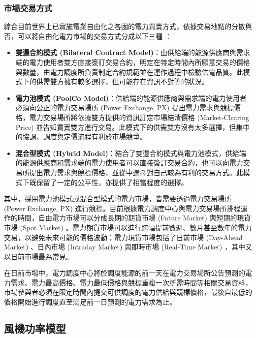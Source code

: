 \subsubsection{市場交易方式}

綜合目前世界上已實施電業自由化之各國的電力買賣方式，依據交易地點的分散與否，可以將自由化電力市場的交易方式分成以下三種 \cite{li2005strategic}：
%
\begin{itemize}
  \item \textbf{雙邊合約模式 (Bilateral Contract Model)}：由供給端的能源供應商與需求端的電力使用者雙方直接簽訂交易合約，明定在特定時間內所願意交易的價格與數量，由電力調度所負責制定合約規範並在運作過程中檢驗供電品質。此模式下的供需雙方擁有較多選擇，但可能存在資訊不對等的狀況。
  \item \textbf{電力池模式 (PoolCo Model)}：供給端的能源供應商與需求端的電力使用者必須向公正的電力交易場所 (Power Exchange, PX) 提出電力需求與競標價格，電力交易場所將依據雙方提供的資訊訂定市場結清價格 (Market-Clearing Price) 並告知買賣雙方進行交易。此模式下的供需雙方沒有太多選擇，但集中的協調、調度與定價流程有利於市場競爭。
  \item \textbf{混合型模式 (Hybrid Model)}：結合了雙邊合約模式與電力池模式，供給端的能源供應商和需求端的電力使用者可以直接簽訂交易合約，也可以向電力交易所提出電力需求與競標價格，並從中選擇對自己較為有利的交易方式。此模式下既保留了一定的公平性，亦提供了相當程度的選擇。
\end{itemize}
%
其中，採用電力池模式或混合型模式的電力市場，皆需要透過電力交易場所 (Power Exchange, PX) 進行競標。目前根據電力調度中心與電力交易場所排程運作的時間，自由電力市場可以分成長期的期貨市場 (Future Market) 與短期的現貨市場 (Spot Market) 。電力期貨市場可以進行跨幅提前數週、數月甚至數年的電力交易，以避免未來可能的價格波動；電力現貨市場包括了日前市場 (Day-Ahead Market) 、日內市場 (Intraday Market) 與即時市場 (Real-Time Market) ，其中又以日前市場最為常見。

在日前市場中，電力調度中心將於調度能源的前一天在電力交易場所公告預測的電力需求、電力最高價格、電力最低價格與競標重複一次所需時間等相關交易資料，市場參與者必須在限定時間內提交可供調度的電力供給與競標價格，最後自最低的價格開始進行調度直至滿足前一日預測的電力需求為止。

\subsection{風機功率模型}

